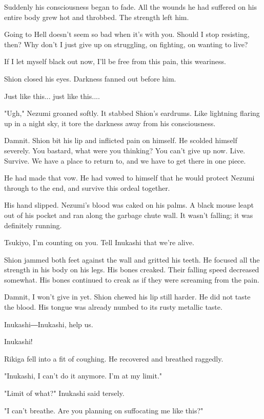 Suddenly his consciousness began to fade. All the wounds he had suffered
on his entire body grew hot and throbbed. The strength left him.

Going to Hell doesn't seem so bad when it's with you. Should I stop
resisting, then? Why don't I just give up on struggling, on fighting, on
wanting to live?

If I let myself black out now, I'll be free from this pain, this
weariness.

Shion closed his eyes. Darkness fanned out before him.

Just like this... just like this....

"Ugh," Nezumi groaned softly. It stabbed Shion's eardrums. Like
lightning flaring up in a night sky, it tore the darkness away from his
consciousness.

Damnit. Shion bit his lip and inflicted pain on himself. He scolded
himself severely. You bastard, what were you thinking? You can't give up
now. Live. Survive. We have a place to return to, and we have to get
there in one piece.

He had made that vow. He had vowed to himself that he would protect
Nezumi through to the end, and survive this ordeal together.

His hand slipped. Nezumi's blood was caked on his palms. A black mouse
leapt out of his pocket and ran along the garbage chute wall. It wasn't
falling; it was definitely running.

Tsukiyo, I'm counting on you. Tell Inukashi that we're alive.

Shion jammed both feet against the wall and gritted his teeth. He
focused all the strength in his body on his legs. His bones creaked.
Their falling speed decreased somewhat. His bones continued to creak as
if they were screaming from the pain.

Damnit, I won't give in yet. Shion chewed his lip still harder. He did
not taste the blood. His tongue was already numbed to its rusty metallic
taste.

Inukashi―Inukashi, help us.

Inukashi!

Rikiga fell into a fit of coughing. He recovered and breathed raggedly.

"Inukashi, I can't do it anymore. I'm at my limit."

"Limit of what?" Inukashi said tersely.

"I can't breathe. Are you planning on suffocating me like this?"

